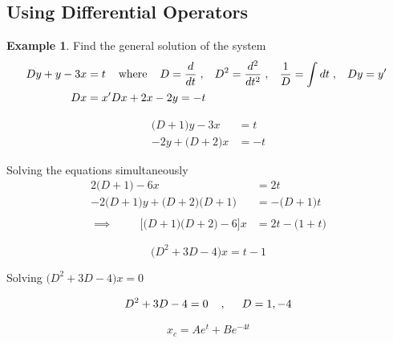 \documentclass[11pt,a4paper]{article}
\theoremstyle{definition}
\newtheorem{exa}[thm]{Example}
\begin{document}
{\color[wave]{485}\subsection{Using Differential Operators}} 

\begin{exa}


Find the general solution of the system
\begin{align*}
Dy + y -3x & = t\hspace{0.4cm} \text{where}\hspace{0.4cm} D = \frac{d}{dt}\hspace{0.1cm}, \hspace{0.3cm} D^2 = \frac{d^2}{dt^2}\hspace{0.1cm}, \hspace{0.3cm} \frac{1}{D}= \int dt\hspace{0.1cm}, \hspace{0.3cm} Dy = y'\hspace{0.1cm}\\ \hspace{0.3cm} Dx &= x'
Dx + 2x - 2y  = -t
\end{align*}

\begin{align*}
\big(D + 1\big) y - 3x & = t\\
-2y + \big(D + 2\big)x & = -t
\end{align*}

 Solving the equations simultaneously
 \begin{align*}
 2\big(D + 1\big) - 6x & = 2t\\
 -2\big(D + 1\big)y + \big(D + 2\big)\big(D + 1\big) & = -\big(D + 1\big) t\\\\
 \implies \hspace{1cm} \Big[ \big(D + 1\big)\big(D + 2\big) - 6\Big] x & = 2t - \big(1 + t\big)
 \end{align*}

$$\big(D^2 + 3D - 4\big) x = t -1 $$

Solving $\big(D^2 + 3D - 4\big)x = 0$

$$D^2 + 3D - 4 = 0\hspace{0.4cm}, \hspace{0.5cm} D = 1,-4$$

$$ x_c = A e^{t} + B e^{-4t}$$


\end{exa}
\end{document}
